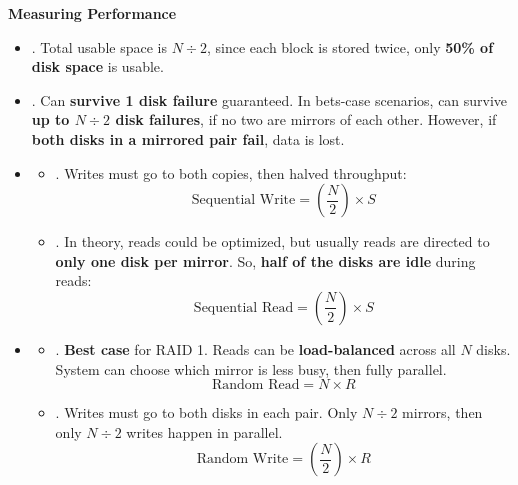 \highspace
\begin{flushleft}
    \textcolor{Green3}{ \textbf{Measuring Performance}}
\end{flushleft}
\begin{itemize}
    \item {}. Total usable space is $N \div 2$, since each block is stored twice, only \textbf{50\% of disk space} is usable.
    \item {}. Can \textbf{survive 1 disk failure} guaranteed. In bets-case scenarios, can survive \textbf{up to $N \div 2$ disk failures}, if no two are mirrors of each other. However, if \textbf{both disks in a mirrored pair fail}, data is lost.
    \item {}
    \begin{itemize}
        \item[\textcolor{Green3}{\faIcon{\speedIcon}}] . Writes must go to both copies, then halved throughput:
        \begin{equation}
            \text{Sequential Write} = \left(\dfrac{N}{2}\right) \times S
        \end{equation}
        \item[\textcolor{Green3}{\faIcon{\speedIcon}}] . In theory, reads could be optimized, but usually reads are directed to \textbf{only one disk per mirror}. So, \textbf{half of the disks are idle} during reads:
        \begin{equation}
            \text{Sequential Read} = \left(\dfrac{N}{2}\right) \times S
        \end{equation}
    \end{itemize}
    \item {}
    \begin{itemize}
        \item[\textcolor{Green3}{\faIcon{\speedIcon}}] . \textbf{Best case} for RAID 1. Reads can be \textbf{load-balanced} across all $N$ disks. System can choose which mirror is less busy, then fully parallel.
        \begin{equation}
            \text{Random Read} = N \times R
        \end{equation}
        \item[\textcolor{Red2}{\faIcon{exclamation-triangle}}] . Writes must go to both disks in each pair. Only $N \div 2$ mirrors, then only $N \div 2$ writes happen in parallel.
        \begin{equation}
            \text{Random Write} = \left(\dfrac{N}{2}\right) \times R
        \end{equation}
    \end{itemize}
\end{itemize}
